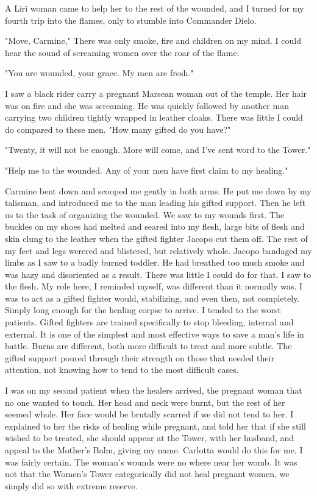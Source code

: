 \documentclass{article}
\begin{document}
A Liri woman came to help her to the rest of the wounded, and I turned for my fourth trip into the flames, only to stumble into Commander Dielo.

"Move, Carmine," There was only smoke, fire and children on my mind. I could hear the sound of screaming women over the roar of the flame. 

"You are wounded, your grace. My men are fresh."

I saw a black rider carry a pregnant Marsean woman out of the temple. Her hair was on fire and she was screaming. He was quickly followed by another man carrying two children tightly wrapped in leather cloaks. There was little I could do compared to these men. "How many gifted do you have?"

"Twenty, it will not be enough. More will come, and I've sent word to the Tower."

"Help me to the wounded. Any of your men have first claim to my healing."

Carmine bent down and scooped me gently in both arms. He put me down by my talisman, and introduced me to the man leading his gifted support. Then he left us to the task of organizing the wounded. We saw to my wounds first. The buckles on my shoes had melted and seared into my flesh, large bits of flesh and skin clung to the leather when the gifted fighter Jacopo cut them off. The rest of my feet and legs werered and blistered, but relatively whole. Jacopo bandaged my limbs as I saw to a badly burned toddler. He had breathed too much smoke and was hazy and disoriented as a result. There was little I could do for that. I saw to the flesh. My role here, I reminded myself, was different than it normally was. I was to act as a gifted fighter would, stabilizing, and even then, not completely. Simply long enough for the healing corpse to arrive. I tended to the worst patients. Gifted fighters are trained specifically to stop bleeding, internal and external. It is one of the simplest and most effective ways to save a man's life in battle. Burns are different, both more difficult to treat and more subtle. The gifted support poured through their strength on those that needed their attention, not knowing how to tend to the most difficult cases. 

I was on my second patient when the healers arrived, the pregnant woman that no one wanted to touch. Her head and neck were burnt, but the rest of her seemed whole. Her face would be brutally scarred if we did not tend to her. I explained to her the risks of healing while pregnant, and told her that if she still wished to be treated, she should appear at the Tower, with her husband, and appeal to the Mother's Balm, giving my name. Carlotta would do this for me, I was fairly certain. The woman's wounds were no where near her womb. It was not that the Women's Tower categorically did not heal pregnant women, we simply did so with extreme reserve. 
\end{document}
